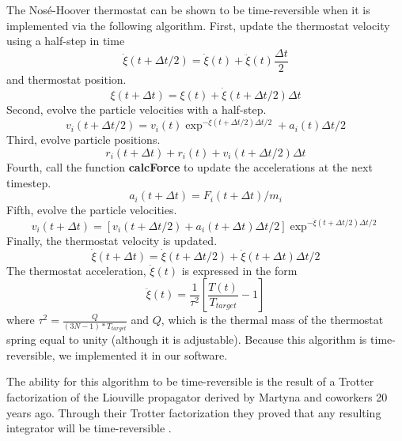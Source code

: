 \documentclass[12pt]{article}
\begin{document}
The Nos\'{e}-Hoover thermostat can be shown to be time-reversible when it is implemented via the following algorithm.
First, update the thermostat velocity using a half-step in time
\begin{equation}
\dot{\xi} (t+ \Delta t/2) = \dot{\xi}(t) + \ddot{\xi}(t) \frac{\Delta t}{2}
\end{equation}
and thermostat position.
\begin{equation}
\xi (t+ \Delta t) = \xi(t) + \dot{\xi}(t+\Delta t/2)\Delta t
\end{equation}
Second, evolve the particle velocities with a half-step.
\begin{equation}
v_i (t+\Delta t/2) = v_i (t) \exp^{-\dot{\xi}(t+\Delta t/2) \Delta t/2} + a_{i} (t) \Delta t/2
\end{equation}
Third, evolve particle positions.
\begin{equation}
r_{i} (t+\Delta t) + r_{i} (t) + v_{i}(t+ \Delta t/2) \Delta t
\end{equation}
Fourth, call the function \textbf{calcForce} to update the accelerations at the next timestep.
\begin{equation}
a_{i} (t+\Delta t) = F_{i} (t+ \Delta t)/m_{i}
\end{equation}
Fifth, evolve the particle velocities.
\begin{equation}
v_{i} (t+ \Delta t)  = [v_{i}(t+\Delta t/2) + a_{i}(t+\Delta t) \Delta t/2]\exp^{-\dot{\xi}(t+\Delta t/2) \Delta t/2}
\end{equation}
Finally, the thermostat velocity is updated.
\begin{equation}
\dot{\xi}(t+\Delta t) = \dot{\xi} (t+\Delta t/2) + \ddot{\xi} (t+\Delta t) \Delta t /2
\end{equation}
The thermostat acceleration, $\ddot{\xi}(t)$ is expressed in the form
\begin{equation}
\ddot{\xi}(t) = \frac{1}{\tau^{2}} [\frac{T(t)}{T_{target}} -1 ]
\end{equation}
where $\tau^{2} = \frac{Q}{(3N-1)*T_{target}}$ and $Q$, which is the thermal mass of the thermostat spring equal to unity (although it is adjustable).
Because this algorithm is time-reversible, we implemented it in our software.

The ability for this algorithm to be time-reversible is the result of a Trotter factorization of the Liouville propagator derived by Martyna and coworkers 20 years ago. Through their Trotter factorization they proved that any resulting integrator will be time-reversible \cite{Tuckerman1992}.
\end{document}
